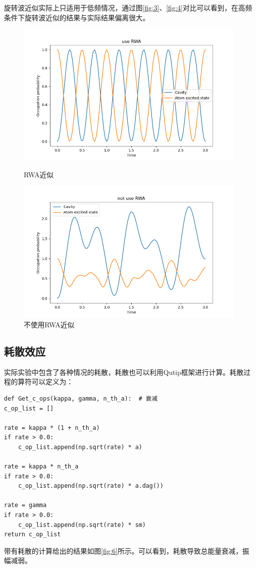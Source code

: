 \documentclass{ctexart}
\begin{document}
旋转波近似实际上只适用于低频情况，通过图\ref{fig:3}、\ref{fig:4}对比可以看到，在高频条件下旋转波近似的结果与实际结果偏离很大。
\begin{figure}[htbp]
    \begin{minipage}[t]{0.5\linewidth}
        \centering
        \includegraphics[width=1.0\linewidth]{4.png}
        \caption{RWA近似}
        \label{fig:4}
    \end{minipage}    
    \begin{minipage}[t]{0.5\linewidth}
        \centering
        \includegraphics[width=1.0\linewidth]{5.png}
        \caption{不使用RWA近似}
        \label{fig:5}
    \end{minipage}
\end{figure}
\subsection{耗散效应}
实际实验中包含了各种情况的耗散，耗散也可以利用Qutip框架进行计算。耗散过程的算符可以定义为：
\begin{verbatim}
def Get_c_ops(kappa, gamma, n_th_a):  # 衰减
c_op_list = []

rate = kappa * (1 + n_th_a)
if rate > 0.0:
    c_op_list.append(np.sqrt(rate) * a)

rate = kappa * n_th_a
if rate > 0.0:
    c_op_list.append(np.sqrt(rate) * a.dag())

rate = gamma
if rate > 0.0:
    c_op_list.append(np.sqrt(rate) * sm)
return c_op_list
\end{verbatim}
带有耗散的计算给出的结果如图\ref{fig:6}所示。可以看到，耗散导致总能量衰减，振幅减弱。
\end{document}
